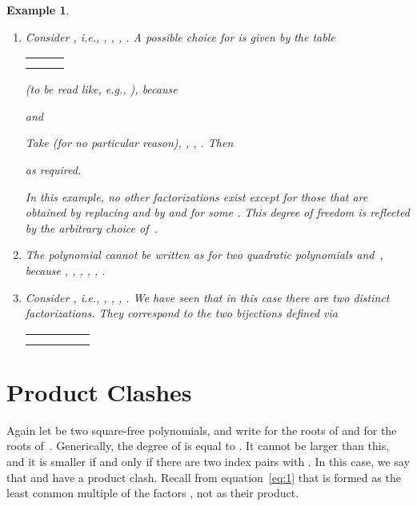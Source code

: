 \documentclass{sig-alternate}
\newtheorem{example}[theorem]{Example}
\begin{document}
\begin{example}
  \begin{enumerate}
  \item Consider , i.e., , , , .
    A possible choice for  is given by the table
    \begin{center}
      \begin{tabular}{c|cc}
         &  &  \\\hline
         &  &  \\
         &  & 
      \end{tabular}
    \end{center}
    (to be read like, e.g., ), because
    
    and
    
    Take  (for no particular reason), ,
    , 
    .
    Then
    
    as required.

    In this example, no other factorizations exist except for those that are
    obtained by replacing  and  by  and
     for some . This degree of freedom is
    reflected by the arbitrary choice of~.    
  \item The polynomial  cannot be written as
     for two quadratic polynomials  and~, because
    ,
    ,
    ,
    ,
    ,
    .
  \item Consider , i.e., , , , .
    We have seen that in this case there are two distinct factorizations.
    They correspond to the two bijections
     defined via
    \begin{center}
      \begin{tabular}{c|cccc}
               &  &  &  &  \\\hline
          &      &       &     &  \\
         &      &       &     & 
      \end{tabular}
    \end{center}
  \end{enumerate}
\end{example}

\section{Product Clashes}

Again let  be two square-free polynomials, and write
 for the roots of  and  for the
roots of~. Generically, the degree of  is equal to
. It cannot be larger than this, and it is smaller if and only
if there are two index pairs  with
. In this case, we say that  and  have a
product clash. Recall from equation~\eqref{eq:1} that  is formed as
the least common multiple of the factors , not as their product.
\end{document}
